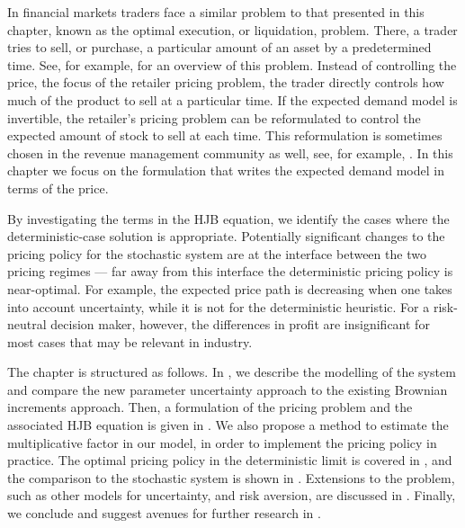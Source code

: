 \documentclass[main.tex]{subfiles}
\begin{document}
In financial markets traders face a similar problem to
that presented in this chapter, known as the optimal execution, or liquidation,
problem. There, a trader tries to sell, or purchase,
a particular amount of an asset by a predetermined time. See, for example,
\citet{cartea2015algorithmic} for an overview of this problem.
Instead of controlling the price, the focus of the retailer pricing
problem, the trader directly controls how much
of the product to sell at a particular time. If the expected demand
model is invertible, the retailer's pricing problem can be
reformulated to control the expected amount of stock to sell at each
time. This reformulation is sometimes chosen in the revenue management
community as well, see, for example, \citet{bitran2003overview}.
In this chapter we focus on the formulation that writes the expected
demand model in terms of the price.

By investigating the terms in the HJB equation,
we identify the cases where the deterministic-case solution is appropriate.
Potentially significant changes to the
pricing policy for the stochastic system are at the interface between
the two pricing regimes --- far away from this interface the
deterministic pricing policy is near-optimal. For example, the
expected price path is decreasing when one takes into account
uncertainty, while it is not for the deterministic heuristic.
For a risk-neutral decision maker, however, the differences in profit
are insignificant for most cases that may be relevant in industry.


The chapter is structured as follows. In , we
describe the modelling of the system and compare the new parameter uncertainty
approach to the existing Brownian increments approach.
Then, a formulation of the pricing problem and the associated HJB
equation is given in . We also propose
a method to estimate the multiplicative factor in our model, in
order to implement the pricing policy in practice.
The optimal pricing policy in the deterministic limit is covered in
, and the comparison to the stochastic
system is shown in .
Extensions to the problem, such as other models for uncertainty, and
risk aversion, are discussed in .
Finally, we conclude and
suggest avenues for further research in .
\end{document}
